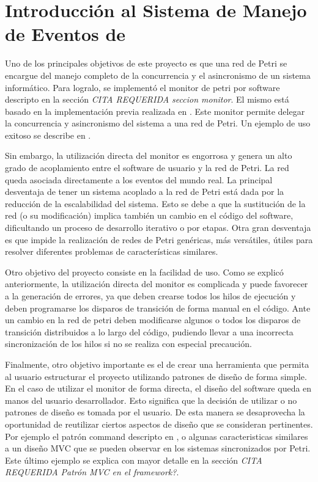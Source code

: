 \section{Introducción al Sistema de Manejo de Eventos de \nombreFramework}
Uno de los principales objetivos de este proyecto es que una red de Petri
se encargue del manejo completo de la concurrencia y el asincronismo de un
sistema informático. Para logralo, se implementó el monitor de petri por software descripto en la
sección \emph{\color{red} CITA REQUERIDA seccion monitor}.
El mismo está basado en la implementación previa realizada en \cite{codegen}.
Este monitor permite delegar la concurrencia y asincronismo del
sistema a una red de Petri. Un ejemplo de uso exitoso se describe en
\cite{Bentivegna-Ludemann}.

Sin embargo, la utilización directa del monitor es engorrosa y genera un
alto grado de acoplamiento entre el software de usuario y la red de Petri. La
red queda asociada directamente a los eventos del mundo real. La principal
desventaja de tener un sistema acoplado a la red de Petri está dada por la
reducción de la escalabilidad del sistema. Esto se debe a que la sustitución de la red (o
su modificación) implica también un cambio en el código del software,
dificultando un proceso de desarrollo iterativo o por etapas. Otra gran
desventaja es que impide la realización de redes de Petri genéricas, más
versátiles, útiles para resolver diferentes problemas de
características similares.

Otro objetivo del proyecto consiste en la facilidad de uso. Como se explicó
anteriormente, la utilización directa del monitor es complicada y puede
favorecer a la generación de errores, ya que deben crearse todos los hilos de
ejecución y deben programarse los disparos de transición de forma manual en el
código. Ante un cambio en la red de petri deben modificarse algunos o todos los
disparos de transición distribuidos a lo largo del código, pudiendo llevar a
una incorrecta sincronización de los hilos si no se realiza con especial precaución.

Finalmente, otro objetivo importante es el de crear una herramienta que permita
al usuario estructurar el proyecto utilizando patrones de diseño de forma
simple. En el caso de utilizar el monitor de forma directa, el diseño del
software queda en manos del usuario desarrollador. Esto significa que la
decisión de utilizar o no patrones de diseño es tomada por el usuario. De
esta manera se desaprovecha la oportunidad de reutilizar ciertos aspectos de
diseño que se consideran pertinentes. Por ejemplo el patrón command descripto en
\cite{chimp}, o algunas caracteristicas similares a un diseño MVC que se pueden
observar en los sistemas sincronizados por Petri. Este último ejemplo se explica
con mayor detalle en la sección \emph{\color{red} CITA REQUERIDA Patrón MVC
en el framework?}.


